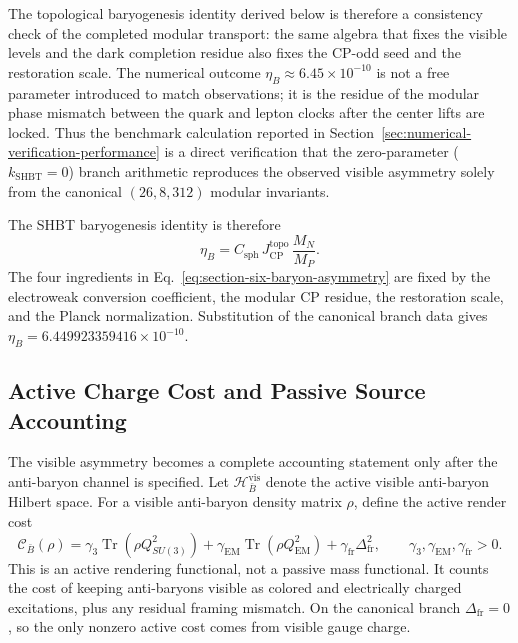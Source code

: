 \documentclass[11pt,letterpaper]{article}
\theoremstyle{plain}
\DeclareMathOperator{\Tr}{Tr}
\newcommand{\Deltafr}{\Delta_{\text{fr}}}
\newcommand{\MP}{M_P}
\begin{document}
The topological baryogenesis identity derived below is therefore a consistency
check of the completed modular transport: the same algebra that fixes the
visible levels and the dark completion residue also fixes the CP-odd seed and
the restoration scale.  The numerical outcome \(\eta_B\approx6.45\times10^{-10}\)
is not a free parameter introduced to match observations; it is the residue of
the modular phase mismatch between the quark and lepton clocks after the center
lifts are locked.  Thus the benchmark calculation reported in
Section~\ref{sec:numerical-verification-performance} is a direct verification that the
zero-parameter ($k_{\text{SHBT}}=0$) branch arithmetic reproduces the observed visible asymmetry
solely from the canonical $(26,8,312)$ modular invariants.

The SHBT baryogenesis identity is therefore
\begin{equation}
\label{eq:section-six-baryon-asymmetry}
 \boxed{
 \eta_B
 =
 C_{\text{sph}}\,J_{\text{CP}}^{\text{topo}}\,\frac{M_N}{\MP}.
 }
\end{equation}
The four ingredients in Eq.~\eqref{eq:section-six-baryon-asymmetry} are fixed
by the electroweak conversion coefficient, the modular CP residue, the
restoration scale, and the Planck normalization.  Substitution of the canonical
branch data gives \(\eta_B=6.449923359416\times10^{-10}\).

\subsection{Active Charge Cost and Passive Source Accounting}

The visible asymmetry becomes a complete accounting statement only after the
anti-baryon channel is specified.  Let $\mathcal H_{\bar B}^{\text{vis}}$ denote
the active visible anti-baryon Hilbert space.  For a visible anti-baryon density
matrix $\rho$, define the active render cost
\begin{equation}
\label{eq:section-six-active-render-cost}
 \boxed{
 \mathcal C_{\bar B}(\rho)
 =
 \gamma_3\Tr(\rho Q_{SU(3)}^2)
 +
 \gamma_{\text{EM}}\Tr(\rho Q_{\text{EM}}^2)
 +
 \gamma_{\text{fr}}\Deltafr^2,
 \qquad
 \gamma_3,\gamma_{\text{EM}},\gamma_{\text{fr}}>0.
 }
\end{equation}
This is an active rendering functional, not a passive mass functional.  It
counts the cost of keeping anti-baryons visible as colored and electrically
charged excitations, plus any residual framing mismatch.  On the canonical
branch $\Deltafr=0$, so the only nonzero active cost comes from visible gauge
charge.
\end{document}
